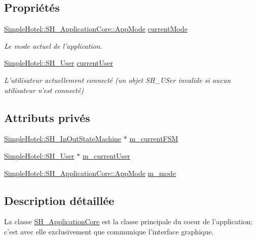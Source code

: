 \subsection*{Propriétés}
\begin{DoxyCompactItemize}
\item 
\hyperlink{classSimpleHotel_1_1SH__ApplicationCore_a5fea25d06c20cd22de5a2221c3a2dddc}{Simple\-Hotel\-::\-S\-H\-\_\-\-Application\-Core\-::\-App\-Mode} \hyperlink{classSimpleHotel_1_1SH__ApplicationCore_a62dd46ad070b7ad8587bc7001a93f6e9}{current\-Mode}
\begin{DoxyCompactList}\small\item\em Le mode actuel de l'application. \end{DoxyCompactList}\item 
\hyperlink{classSimpleHotel_1_1SH__User}{Simple\-Hotel\-::\-S\-H\-\_\-\-User} \hyperlink{classSimpleHotel_1_1SH__ApplicationCore_a8404f82d10f1510c5f5259794dd3a553}{current\-User}
\begin{DoxyCompactList}\small\item\em L'utilisateur actuellement connecté (un objet S\-H\-\_\-\-U\-Ser invalide si aucun utilisateur n'est connecté) \end{DoxyCompactList}\end{DoxyCompactItemize}
\subsection*{Attributs privés}
\begin{DoxyCompactItemize}
\item 
\hyperlink{classSimpleHotel_1_1SH__InOutStateMachine}{Simple\-Hotel\-::\-S\-H\-\_\-\-In\-Out\-State\-Machine} $\ast$ \hyperlink{classSimpleHotel_1_1SH__ApplicationCore_adc77b4d9a57cb898b672f344c9596190}{m\-\_\-current\-F\-S\-M}
\item 
\hyperlink{classSimpleHotel_1_1SH__User}{Simple\-Hotel\-::\-S\-H\-\_\-\-User} $\ast$ \hyperlink{classSimpleHotel_1_1SH__ApplicationCore_afd7cbbb3267dd91e453bfc85211437c7}{m\-\_\-current\-User}
\item 
\hyperlink{classSimpleHotel_1_1SH__ApplicationCore_a5fea25d06c20cd22de5a2221c3a2dddc}{Simple\-Hotel\-::\-S\-H\-\_\-\-Application\-Core\-::\-App\-Mode} \hyperlink{classSimpleHotel_1_1SH__ApplicationCore_a66a3e44eeddafaea7553740a9686d2b3}{m\-\_\-mode}
\end{DoxyCompactItemize}


\subsection{Description détaillée}
La classe \hyperlink{classSimpleHotel_1_1SH__ApplicationCore}{S\-H\-\_\-\-Application\-Core} est la classe principale du coeur de l'application; c'est avec elle exclusivement que communique l'interface graphique. 

